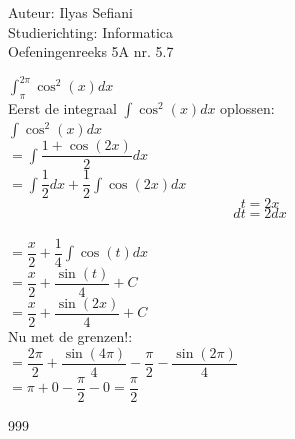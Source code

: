 \documentclass[a4paper]{article}
\newcommand{\dint}{\displaystyle\int}
\begin{document}
\noindent \large Auteur: Ilyas Sefiani \\
\noindent \large Studierichting: Informatica\\
\noindent \large Oefeningenreeks 5A nr. 5.7\\

\medskip

\normalsize

$\dint_{\pi}^{2\pi} \cos^2(x)dx$\\

Eerst de integraal $\displaystyle\int \cos^2(x)dx$ oplossen:\\

$\displaystyle\int \cos^2(x)dx$\\

$= \displaystyle\int \dfrac{1+\cos(2x)}{2}dx$\\

$= \displaystyle\int \dfrac{1}{2}dx + \dfrac{1}{2}\displaystyle\int \cos(2x)dx$\\

$$t = 2x$$ $$dt = 2dx$$\\

$= \dfrac{x}{2} + \dfrac{1}{4}\displaystyle\int \cos(t)dx$\\

$= \dfrac{x}{2} + \dfrac{\sin(t)}{4} + C$\\

$= \dfrac{x}{2} + \dfrac{\sin(2x)}{4} + C$\\

Nu met de grenzen!:\\

$= \dfrac{2\pi}{2} + \dfrac{\sin(4\pi)}{4} - \dfrac{\pi}{2} - \dfrac{\sin(2\pi)}{4}$\\

$= \pi + 0 - \dfrac{\pi}{2} - 0 = \dfrac{\pi}{2}$\\

\begin{thebibliography}{999}
\end{thebibliography}
\end{document}

